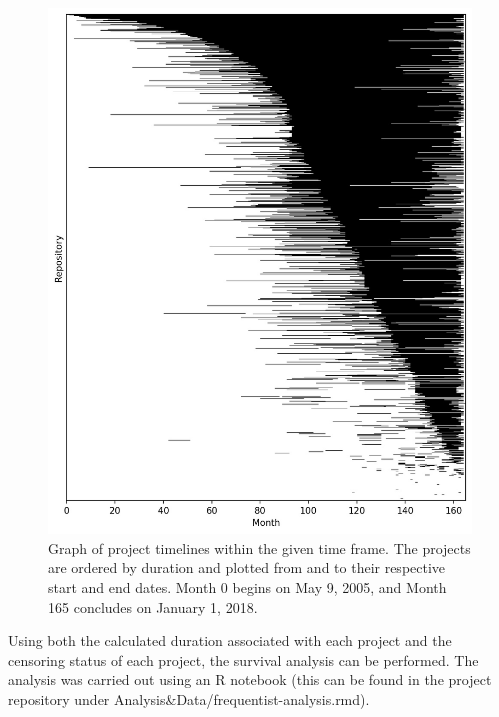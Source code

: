 \documentclass[acmconf]{acmart}
\begin{document}
\begin{figure}[ht]
\centering
\includegraphics[scale=0.5]{figure1.jpg}
\caption{Graph of project timelines within the given time frame. The projects are ordered by duration and plotted from and to their respective start and end dates. Month 0 begins on May 9, 2005, and Month 165 concludes on January 1, 2018.}
\label{fig:figure-1}
\end{figure}

Using both the calculated duration associated with each project and the censoring status of each project, the survival analysis can be performed.
The analysis was carried out using an R notebook (this can be found in the project repository under Analysis\&Data/frequentist-analysis.rmd).
\end{document}

